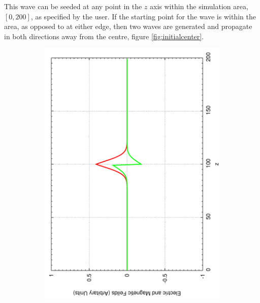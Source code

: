 This wave can be seeded at any point in the $z$ axis within the simulation area, $[0,200]$, as specified by the user. If the starting point for the wave is within the area, as opposed to at either edge, then two waves are generated and propagate in both directions away from the centre, figure \ref{fig:initialcenter}.
\begin{figure}[ht]
        \centering
        \begin{subfigure}[ht]{0.45\textwidth}
                \centering
                \includegraphics[angle=270, width=\textwidth]{centerseed1.pdf}
        \end{subfigure}%
        ~
        \begin{subfigure}[ht]{0.45\textwidth}
                \centering

\end{subfigure}
\end{figure}
